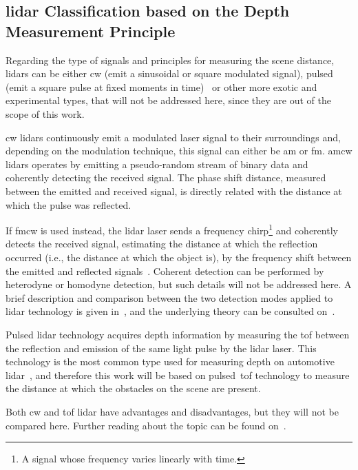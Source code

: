 \subsection{\acs{lidar} Classification based on the Depth Measurement Principle}
Regarding the type of signals and principles for measuring the scene distance, \acp{lidar} can be either \ac{cw} (emit a sinusoidal or square modulated signal), pulsed (emit a square pulse at fixed moments in time)~\cite{Payne2009, TexasLiDAR, SpringerOptics} or other more exotic and experimental types, that will not be addressed here, since they are out of the scope of this work.

\ac{cw} \acp{lidar} continuously emit a modulated \ac{laser} signal to their surroundings and, depending on the modulation technique, this signal can either be \ac{am} or \ac{fm}\cite{TexasLiDAR}. \ac{am}\ac{cw} \acp{lidar} operates by emitting a pseudo-random stream of binary data and coherently detecting the received signal. The phase shift distance, measured between the emitted and received signal, is directly related with the distance at which the pulse was reflected.

If \ac{fm}\ac{cw} is used instead, the \ac{lidar} \ac{laser} sends a frequency chirp\footnote{A signal whose frequency varies linearly with time.} and coherently detects the received signal, estimating the distance at which the reflection occurred (i.e., the distance at which the object is), by the frequency shift between the emitted and reflected signals~\cite{Payne2009, TexasLiDAR}. Coherent detection can be performed by heterodyne or homodyne detection, but such details will not be addressed here. A brief description and comparison between the two detection modes applied to \ac{lidar} technology is given in~\cite{Conroy2009}, and the underlying theory can be consulted on~\cite{Carlson2010, SpringerOptics}.

Pulsed \ac{lidar} technology acquires depth information by measuring the \acf{tof} between the reflection and emission of the same light pulse by the \ac{lidar} \ac{laser}. This technology is the most common type used for measuring depth on automotive \ac{lidar}~\cite{Sullivan2016}, and therefore this work will be based on pulsed~\ac{tof} technology to measure the distance at which the obstacles on the scene are present.

Both \ac{cw} and \ac{tof} \ac{lidar} have advantages and disadvantages, but they will not be compared here. Further reading about the topic can be found on~\cite{Sullivan2016, Simonite2017, Payne2009, TexasLiDAR}.


